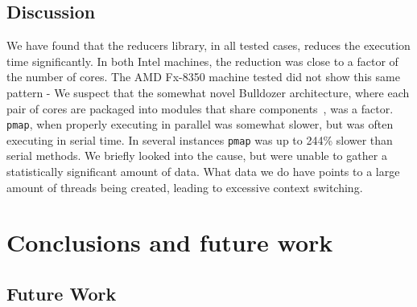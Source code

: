 \documentclass[12pt]{article}
\newcommand{\clocode}[1]{{\texttt {#1}}}
\begin{document}
\subsection{Discussion}\label{sec:discussion}
We have found that the reducers library, in all tested cases, reduces the execution time significantly. In both Intel machines, the reduction was close to a factor of the number of cores. The AMD Fx-8350 machine tested did not show this same pattern - We suspect that the somewhat novel Bulldozer architecture, where each pair of cores are packaged into modules that share components~\cite{McIntyre:2012},  was a factor. \clocode{pmap}, when properly executing in parallel was somewhat slower, but was often executing in serial time. In several instances \clocode{pmap} was up to 244\% slower than serial methods. We briefly looked into the cause, but were unable to gather a statistically significant amount of data. What data we do have points to a large amount of threads being created, leading to excessive context switching. 

\section{Conclusions and future work}\label{sec:conclusion}




\subsection{Future Work}\label{sec:future}








%
%




%  
%
%










\end{document}
